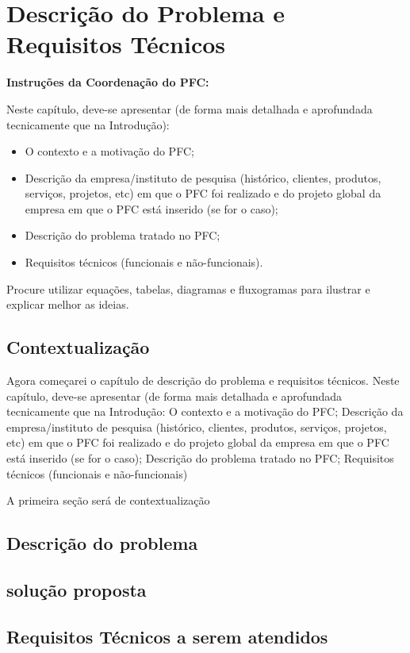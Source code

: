 \chapter{Descrição do Problema e Requisitos Técnicos}\label{cap:descricao_problema_e_requisitos}

\textbf{Instruções da Coordenação do PFC:}

Neste capítulo, deve-se apresentar (de forma mais detalhada e aprofundada tecnicamente que na Introdução):
\begin{itemize}
	\item O contexto e a motivação do PFC;
	\item Descrição da empresa/instituto de pesquisa (histórico, clientes, produtos, serviços, projetos, etc) em que o PFC foi realizado e do projeto global da empresa em que o PFC está inserido (se for o caso);
     \item Descrição do problema tratado no PFC;
     \item Requisitos técnicos (funcionais e não-funcionais).
\end{itemize}

Procure utilizar equações, tabelas, diagramas e fluxogramas para ilustrar e explicar melhor as ideias.


\section{Contextualização}

Agora começarei o capítulo de descrição do problema e requisitos técnicos. Neste capítulo, deve-se apresentar (de forma mais detalhada e aprofundada tecnicamente que na Introdução:
O contexto e a motivação do PFC;
Descrição da empresa/instituto de pesquisa (histórico, clientes, produtos, serviços, projetos, etc) em que o PFC foi realizado e do projeto global da empresa em que o PFC está inserido (se for o caso);
Descrição do problema tratado no PFC;
Requisitos técnicos (funcionais e não-funcionais)

A primeira seção será de contextualização
\section{Descrição do problema}
\section{solução proposta}
\section{Requisitos Técnicos a serem atendidos}
